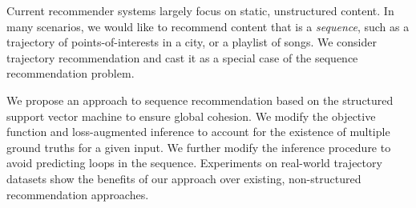 
Current recommender systems largely focus on static, unstructured content.
In many scenarios, we would like to recommend content that is a \emph{sequence}, %
such as %
a trajectory of points-of-interests in a city, or a playlist of songs.
We consider trajectory recommendation and cast it as a special case of the sequence recommendation problem.

We propose an approach to sequence recommendation based on the structured support vector machine to ensure global cohesion.
We modify the objective function and loss-augmented inference to account for the existence of multiple ground truths for a given input.
We further modify the inference procedure to avoid predicting loops in the sequence.
Experiments on real-world trajectory datasets show the benefits of our approach over existing, non-structured recommendation approaches.
